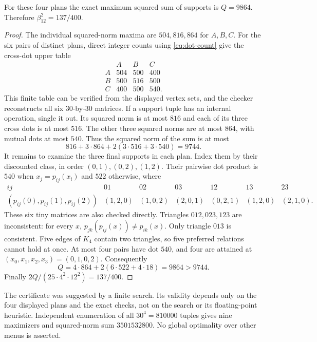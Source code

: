 \begin{proposition}\label{prop:twelve}
For these four plans the exact maximum squared sum of supports is
$Q=9864$. Therefore $\beta_{12}^2=137/400$.
\end{proposition}
\begin{proof}
The individual squared-norm maxima are $504,816,864$ for $A,B,C$.
For the six pairs of distinct plans, direct integer counts using
\eqref{eq:dot-count} give the cross-dot upper table
\[
\begin{array}{c|rrr}&A&B&C\\\hline
 A&504&500&400\\B&500&516&500\\C&400&500&540.
\end{array}
\]
This finite table can be verified from the displayed vertex sets, and the
checker reconstructs all six $30$-by-$30$ matrices. If a support tuple has
an internal operation, single it out. Its squared norm is at most $816$ and each
of its three cross dots is at most $516$. The other three squared norms are at
most $864$, with mutual dots at most $540$. Thus the squared norm of the sum is at most
\[
 816+3\cdot864+2(3\cdot516+3\cdot540)=9744.
\]
It remains to examine the three final supports in each plan. Index them
by their discounted class, in order $(0,1),(0,2),(1,2)$. Their pairwise
dot product is $540$ when $x_j=p_{ij}(x_i)$ and $522$ otherwise, where
\[
\begin{array}{c|rrrrrr}
 ij&01&02&03&12&13&23\\\hline
 (p_{ij}(0),p_{ij}(1),p_{ij}(2))
 &(1,2,0)&(1,0,2)&(2,0,1)&(0,2,1)&(1,2,0)&(2,1,0).
\end{array}
\]
These six tiny matrices are also checked directly. Triangles $012,023,123$
are inconsistent: for every $x$, $p_{jk}(p_{ij}(x))\ne p_{ik}(x)$.
Only triangle $013$ is consistent. Five edges of $K_4$ contain two
triangles, so five preferred relations cannot hold at once. At most four
pairs have dot $540$, and four are attained at $(x_0,x_1,x_2,x_3)=(0,1,0,2)$.
Consequently
\[
 Q=4\cdot864+2(6\cdot522+4\cdot18)=9864>9744.
\]
Finally $2Q/(25\cdot4^2\cdot12^2)=137/400$.
\end{proof}
The certificate was suggested by a finite search. Its validity depends only
on the four displayed plans and the exact checks, not on the search or its
floating-point heuristic. Independent enumeration of all $30^4=810000$
tuples gives nine maximizers and squared-norm sum $3501532800$.
No global optimality over other menus is asserted.

